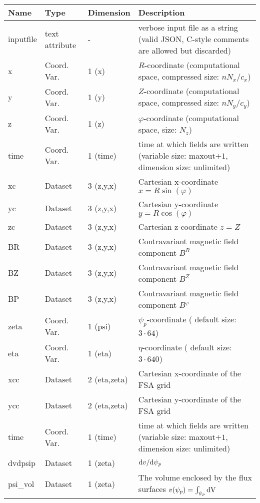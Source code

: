 \begin{longtable}{lll>{\RaggedRight}p{7cm}}
\toprule
\rowcolor{gray!50}\textbf{Name} &  \textbf{Type} & \textbf{Dimension} & \textbf{Description}  \\ \midrule
inputfile  &     text attribute & - & verbose input file as a string (valid JSON, C-style comments are allowed but discarded) \\
x                & Coord. Var. & 1 (x) & $R$-coordinate (computational space, compressed size: $nN_x/c_x$)\\
y                & Coord. Var. & 1 (y) & $Z$-coordinate (computational space, compressed size: $nN_y/c_y$)\\
z                & Coord. Var. & 1 (z) & $\varphi$-coordinate (computational space, size: $N_z$) \\
time             & Coord. Var. & 1 (time)& time at which fields are written (variable size: maxout$+1$, dimension size: unlimited) \\
xc           & Dataset & 3 (z,y,x) & Cartesian x-coordinate $x=R\sin(\varphi)$ \\
yc           & Dataset & 3 (z,y,x) & Cartesian y-coordinate $y=R\cos(\varphi)$\\
zc           & Dataset & 3 (z,y,x) & Cartesian z-coordinate $z=Z$ \\
BR               & Dataset & 3 (z,y,x) & Contravariant magnetic field component $B^R$ \\
BZ               & Dataset & 3 (z,y,x) & Contravariant magnetic field component $B^Z$ \\
BP               & Dataset & 3 (z,y,x) & Contravariant magnetic field component $B^\varphi$ \\
zeta             & Coord. Var. & 1 (psi) & $\psi_p$-coordinate ( default size: $3\cdot 64$) \\
eta              & Coord. Var. & 1 (eta) & $\eta$-coordinate ( default size: $3\cdot 640$) \\
xcc              & Dataset & 2 (eta,zeta) & Cartesian x-coordinate of the FSA grid \\
ycc              & Dataset & 2 (eta,zeta) & Cartesian y-coordinate of the FSA grid\\
time             & Coord. Var. & 1 (time)& time at which fields are written (variable size: maxout$+1$, dimension size: unlimited) \\
dvdpsip          & Dataset & 1 (zeta) & $\mathrm{d} v/\mathrm{d}\psi_p$ \\
psi\_vol         & Dataset & 1 (zeta) & The volume enclosed by the flux surfaces $v(\psi_p) = \int_{\psi_p} \mathrm{dV}\, $ \\

\end{longtable}
